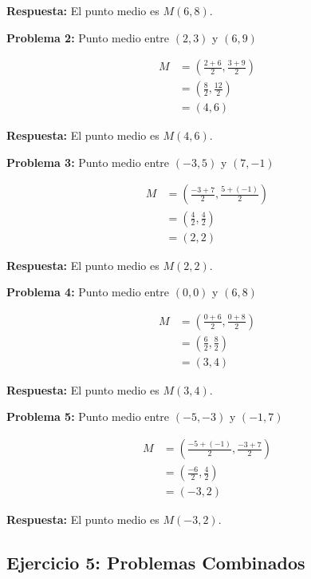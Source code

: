\textbf{Respuesta:} El punto medio es $M(6, 8)$.

\medskip

\textbf{Problema 2:} Punto medio entre $(2, 3)$ y $(6, 9)$

\begin{align*}
M &= \left(\frac{2 + 6}{2}, \frac{3 + 9}{2}\right) \\
  &= \left(\frac{8}{2}, \frac{12}{2}\right) \\
  &= (4, 6)
\end{align*}

\textbf{Respuesta:} El punto medio es $M(4, 6)$.

\medskip

\textbf{Problema 3:} Punto medio entre $(-3, 5)$ y $(7, -1)$

\begin{align*}
M &= \left(\frac{-3 + 7}{2}, \frac{5 + (-1)}{2}\right) \\
  &= \left(\frac{4}{2}, \frac{4}{2}\right) \\
  &= (2, 2)
\end{align*}

\textbf{Respuesta:} El punto medio es $M(2, 2)$.

\medskip

\textbf{Problema 4:} Punto medio entre $(0, 0)$ y $(6, 8)$

\begin{align*}
M &= \left(\frac{0 + 6}{2}, \frac{0 + 8}{2}\right) \\
  &= \left(\frac{6}{2}, \frac{8}{2}\right) \\
  &= (3, 4)
\end{align*}

\textbf{Respuesta:} El punto medio es $M(3, 4)$.

\medskip

\textbf{Problema 5:} Punto medio entre $(-5, -3)$ y $(-1, 7)$

\begin{align*}
M &= \left(\frac{-5 + (-1)}{2}, \frac{-3 + 7}{2}\right) \\
  &= \left(\frac{-6}{2}, \frac{4}{2}\right) \\
  &= (-3, 2)
\end{align*}

\textbf{Respuesta:} El punto medio es $M(-3, 2)$.

\newpage

\subsection*{Ejercicio 5: Problemas Combinados}

